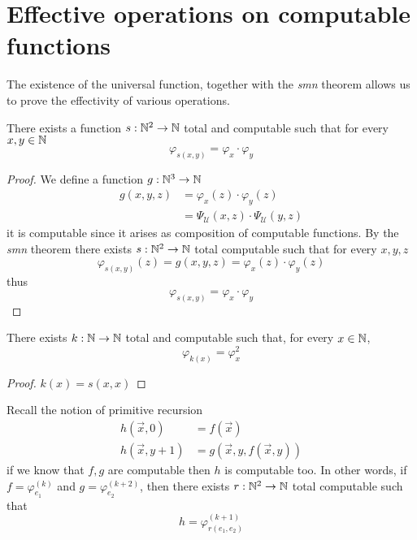 \section{Effective operations on computable functions}
The existence of the universal function, together with the \emph{smn}
theorem allows us to prove the effectivity of various
operations.
\begin{proposition}
  There exists a function $s: \mathbb{N}^2 \rightarrow \mathbb{N}$ total and computable
such that for every $x, y \in \mathbb{N}$
 \[\varphi_{s(x,y)} = \varphi_x \cdot \varphi_y\]
\begin{proof}
  We define a function $g : \mathbb{N}^3 \to \mathbb{N}$
  \begin{align*}
    g(x,y,z) &= \varphi_x(z) \cdot \varphi_y(z) \\
    &= \Psi_{\mathcal{U}}(x,z) \cdot \Psi_{\mathcal{U}}(y,z)
  \end{align*}
  it is computable since it arises as composition of computable functions. 
  By the \emph{smn} theorem there
  exists $s: \mathbb{N}^2 \rightarrow \mathbb{N}$ total computable such that for every $x,y,z$
  \[
    \varphi_{s(x,y)}(z) = g(x,y,z) = \varphi_x(z) \cdot \varphi_y(z)
  \]
  thus
  \[
    \varphi_{s(x,y)} = \varphi_x \cdot \varphi_y
  \]
\end{proof}
\end{proposition}


\begin{proposition}
There exists $k:\mathbb{N} \to \mathbb{N}$ total and computable such that, for every $x \in \mathbb{N}$,
\[\varphi_{k(x)} = \varphi_x^2\]
\begin{proof}
$k(x) = s(x,x)$
\end{proof}
\end{proposition}

\begin{proposition}
Recall the notion of primitive recursion
\begin{align*}
  h(\vec{x}, 0) &= f(\vec{x}) \\
  h(\vec{x}, y+1) &= g(\vec{x}, y, f(\vec{x},y))
\end{align*}
if we know that
$f,g$ are computable then $h$ is computable too. In other words, if
$f = \varphi_{e_1}^{(k)}$ and $g = \varphi_{e_2}^{(k+2)}$, then there exists $r: \mathbb{N}^2 \rightarrow \mathbb{N}$ total
computable such that
\[h = \varphi_{r(e_1, e_2)}^{(k+1)}\]
\end{proposition}

